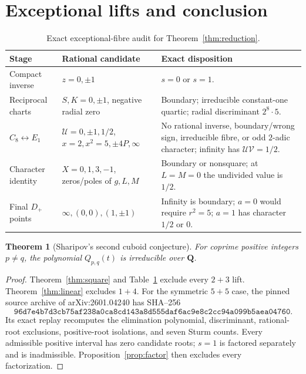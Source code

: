 \documentclass[11pt]{article}
\newtheorem{theorem}{Theorem}
\newcommand{\Q}{\mathbf Q}
\begin{document}
\section{Exceptional lifts and conclusion}

\begin{table}[ht]
\centering\small
\begin{tabular}{>{\raggedright\arraybackslash}p{}
>{\raggedright\arraybackslash}p{}
>{\raggedright\arraybackslash}p{}}
\toprule
Stage & Rational candidate & Exact disposition\\
\midrule
Compact inverse & \(z=0,\pm1\) & \(s=0\) or \(s=1\).\\
Reciprocal charts & \(S,K=0,\pm1\), negative radial zero &
Boundary; irreducible constant-one quartic; radial discriminant
\(2^8\cdot5\).\\
\(C_8\leftrightarrow E_1\) &
\(\mathcal U=0,\pm1,1/2\), \(x=2,x^2=5,\pm4P,\infty\) &
No rational inverse, boundary/wrong sign, irreducible fibre, or odd
\(2\)-adic character; infinity has \(\mathcal U\mathcal V=1/2\).\\
Character identity & \(X=0,1,3,-1\), zeros/poles of \(g,L,M\) &
Boundary or nonsquare; at \(L=M=0\) the undivided value is \(1/2\).\\
Final \(D_+\) points & \(\infty,(0,0),(1,\pm1)\) &
Infinity is boundary; \(a=0\) would require \(r^2=5\); \(a=1\) has
character \(1/2\) or \(0\).\\
\bottomrule
\end{tabular}
\caption{Exact exceptional-fibre audit for Theorem~\ref{thm:reduction}.}
\label{tab:exceptions}
\end{table}

\begin{theorem}[Sharipov's second cuboid conjecture]
For coprime positive integers \(p\ne q\), the polynomial \(Q_{p,q}(t)\) is
irreducible over \(\Q\).
\end{theorem}

\begin{proof}
Theorem~\ref{thm:square} and Table~\ref{tab:exceptions} exclude every
\(2+3\) lift.  Theorem~\ref{thm:linear} excludes \(1+4\).  For the symmetric
\(5+5\) case, the pinned source archive of arXiv:2601.04240 has SHA--256
\[
\texttt{96d7e4b7d3cb75af238a0ca8cd143a8d555daf6ac9e8c2cc94a099b5aea04760}.
\]
Its exact replay recomputes the elimination polynomial, discriminant,
rational-root exclusions, positive-root isolations, and seven Sturm counts.
Every admissible positive interval has zero candidate roots; \(s=1\) is
factored separately and is inadmissible.  Proposition~\ref{prop:factor}
then excludes every factorization.
\end{proof}
\end{document}
